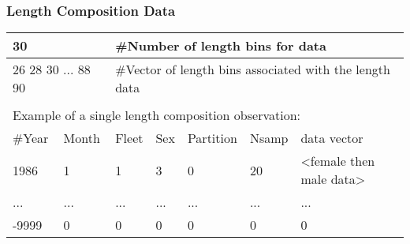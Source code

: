 \subsubsection{Length Composition Data}
\begin{center}
	\begin{tabular}{p{1.5cm} p{1.5cm} p{1.5cm} p{1.5cm} p{1.5cm} p{1.5cm} p{5cm}}
		\hline
		\multicolumn{2}{l}{30} & \multicolumn{5}{l}{\#Number of length bins for data}\\
		\hline
		\multicolumn{2}{l}{26 28 30 ... 88 90} &  \multicolumn{5}{l}{\#Vector of length bins associated with the length data}\\
		\hline
		\\
		\multicolumn{7}{l}{Example of a single length composition observation:} \\
		\hline
		\#Year & Month & Fleet & Sex & Partition & Nsamp & data vector\\
		\hline
		1986 & 1 & 1 & 3 & 0 & 20 & <female then male data> \\
		... & ...& ... & ... & ...& ... & ... \\
		-9999 & 0 & 0 & 0 & 0 & 0 & 0 \\
		\hline	
	\end{tabular}
\end{center}

